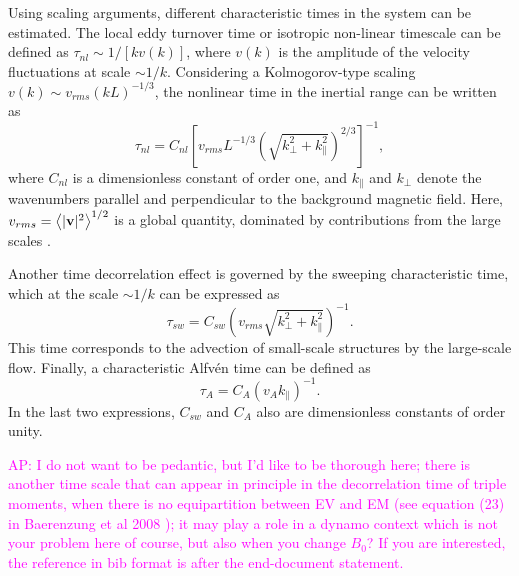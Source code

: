 \documentclass[aip,pop,reprint,amsmath,amssymb,floatfix]{revtex4-1}
\def\AD#1{{\textcolor{magenta}{#1}}}
\begin{document}
Using scaling arguments, different characteristic times in the system can be estimated. The local eddy turnover time or isotropic non-linear timescale can be defined as $\tau_{nl} \sim 1/\left[ k v(k) \right]$, where $v(k)$ is the amplitude of the velocity fluctuations at scale $\sim 1/k$. Considering a Kolmogorov-type scaling $v(k) \sim v_{rms} \left(kL\right)^{-1/3}$, the nonlinear time in the inertial range can be written as
\begin{equation}
\tau_{nl} = C_{nl} \left [
   v_{rms} L^{-1/3} \left(\sqrt{k^2_\perp +
   k^2_\parallel}\right)^{2/3}\right ]^{-1},
\label{eq:taunl}
\end{equation}
 where $C_{nl}$ is a
dimensionless constant of order one, and $k_\parallel$ and $k_\perp$ denote the wavenumbers parallel and perpendicular to the background magnetic field. Here, $v_{rms} = \left\langle |{\bf v}|^2 \right\rangle ^{1/2}$ is a global quantity, dominated by contributions from the large scales \cite{zhou_magnetohydrodynamic_2004, matthaeus_anisotropic_2009}.

Another time decorrelation effect is governed by the sweeping characteristic time, which at the scale $\sim 1/k$ can be expressed as
\begin{equation}
\tau_{sw} = C_{sw} \left( v_{rms}\sqrt{k^2_\perp + k^2_\parallel}
    \right)^{-1} .
\label{eq:tausw}
\end{equation}
This time corresponds to the advection of small-scale structures by the large-scale flow. Finally, a characteristic Alfv\'en time can be defined as
\begin{equation}
\tau_A= C_A \left( v_A k_\parallel \right)^{-1} .
\label{eq:taua}
\end{equation}
In the last two expressions, $C_{sw}$ and $C_A$ also are dimensionless constants of order unity.

\AD{AP: I do not want to be pedantic, but I'd like to be thorough here; there is another time scale that can appear in principle in the decorrelation time of triple moments, when there is no equipartition between EV and EM (see equation (23) in Baerenzung et al 2008 \cite{baerenzung_08b}); it may play a role in a dynamo context which is not your problem here of course, but also when you change $B_0$? If you are interested, the reference in bib format is after the end-document statement.}
\end{document}
